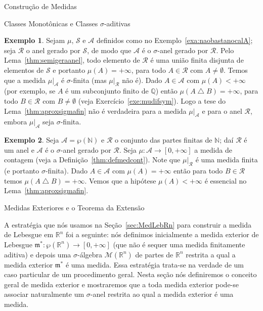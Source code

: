 \documentclass[oneside,final,11pt]{amsbook}
\newcommand{\R}{\mathds R}
\newcommand{\N}{\mathds N}
\newcommand{\Q}{\mathds Q}
\newcommand{\leb}{\mathfrak m}
\newcommand{\Lebmens}{\mathcal M}
\theoremstyle{remark}\newtheorem{exercise}{Exercício}[chapter]
\theoremstyle{remark}\newtheorem{*exercise}[exercise]{\hbox to 0pt{\hskip 0pt minus 1fil*}Exercício}
\theoremstyle{definition}\newtheorem{exdefin}{Definição}[chapter]
\theoremstyle{plain}\newtheorem{teo}{Teorema}[section]
\theoremstyle{plain}\newtheorem{lem}[teo]{Lema}
\theoremstyle{plain}\newtheorem{prop}[teo]{Proposição}
\theoremstyle{plain}\newtheorem{cor}[teo]{Corolário}
\theoremstyle{definition}\newtheorem{defin}[teo]{Definição}
\theoremstyle{remark}\newtheorem{rem}[teo]{Observação}
\theoremstyle{definition}\newtheorem{notation}[teo]{Notação}
\theoremstyle{definition}\newtheorem{convention}[teo]{Convenção}
\theoremstyle{definition}\newtheorem{example}[teo]{Exemplo}
\numberwithin{section}{chapter}
\numberwithin{equation}{section}
\begin{document}
\begin{chapter}{Construção de Medidas}
\begin{section}{Classes Monotônicas e Classes ${\sigma}$-aditivas}
\begin{example}
Sejam $\mu$, $\mathcal S$ e $\mathcal A$ definidos como no Exemplo~\ref{exa:naobastanocalA};
seja $\mathcal R$ o anel gerado por $\mathcal S$, de modo que $\mathcal A$ é o $\sigma$-anel
gerado por $\mathcal R$. Pelo Lema~\ref{thm:semigeraanel}, todo elemento de
$\mathcal R$ é uma união finita disjunta de elementos de $\mathcal S$ e portanto
$\mu(A)=+\infty$, para todo $A\in\mathcal R$ com $A\ne\emptyset$. Temos que a medida
$\mu\vert_{\mathcal A}$ é $\sigma$-finita (mas $\mu\vert_{\mathcal R}$ não é). Dado
$A\in\mathcal A$ com $\mu(A)<+\infty$ (por exemplo, se $A$ é um subconjunto finito de $\Q$)
então $\mu(A\bigtriangleup B)=+\infty$, para todo $B\in\mathcal R$ com $B\ne\emptyset$
(veja Exercício~\ref{exe:mudifsym}). Logo a tese do Lema~\ref{thm:aproxsigmafin} não é verdadeira
para a medida $\mu\vert_{\mathcal A}$ e para o anel $\mathcal R$, embora $\mu\vert_{\mathcal A}$
seja $\sigma$-finita.
\end{example}

\begin{example}
Seja $\mathcal A=\wp(\N)$ e $\mathcal R$ o conjunto das partes finitas de $\N$; daí $\mathcal R$
é um anel e $\mathcal A$ é o $\sigma$-anel gerado por $\mathcal R$. Seja $\mu:\mathcal A\to[0,+\infty]$
a medida de contagem (veja a Definição~\ref{thm:defmedcont}). Note que $\mu\vert_{\mathcal R}$
é uma medida finita (e portanto $\sigma$-finita). Dado $A\in\mathcal A$ com $\mu(A)=+\infty$
então para todo $B\in\mathcal R$ temos $\mu(A\bigtriangleup B)=+\infty$.
Vemos que a hipótese $\mu(A)<+\infty$ é essencial no Lema~\ref{thm:aproxsigmafin}.
\end{example}

\end{section}

\begin{section}{Medidas Exteriores e o Teorema da Extensão}
\label{sec:TeoExtend}

A estratégia que nós usamos na Seção~\ref{sec:MedLebRn} para construir a medida
de Lebesgue em $\R^n$ foi a seguinte: nós definimos inicialmente a medida exterior
de Lebesgue $\leb^*:\wp(\R^n)\to[0,+\infty]$ (que não é sequer uma medida finitamente aditiva)
e depois uma $\sigma$-álgebra $\Lebmens(\R^n)$ de partes de $\R^n$ restrita a qual a
medida exterior $\leb^*$ é uma medida. Essa estratégia trata-se na verdade de um caso
particular de um procedimento geral. Nesta seção nós definiremos o conceito
geral de medida exterior e mostraremos que a toda medida exterior pode-se associar
naturalmente um $\sigma$-anel restrita ao qual a medida exterior é uma medida.


\end{section}
\end{chapter}
\end{document}
